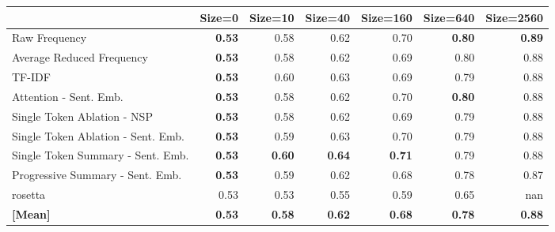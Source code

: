 \begin{tabular}{lrrrrrr}
\toprule
 & Size=0 & Size=10 & Size=40 & Size=160 & Size=640 & Size=2560 \\
\midrule
Raw Frequency & \cellcolor[RGB]{63,83,198}\textbf{0.53} & \cellcolor[RGB]{105,139,239}0.58 & \cellcolor[RGB]{142,177,253}0.62 & \cellcolor[RGB]{214,219,228}0.70 & \cellcolor[RGB]{243,152,121}\textbf{0.80} & \cellcolor[RGB]{179,3,38}\textbf{0.89} \\
Average Reduced Frequency & \cellcolor[RGB]{63,83,198}\textbf{0.53} & \cellcolor[RGB]{105,139,239}0.58 & \cellcolor[RGB]{141,175,253}0.62 & \cellcolor[RGB]{211,219,230}0.69 & \cellcolor[RGB]{244,154,123}0.80 & \cellcolor[RGB]{181,8,39}0.88 \\
TF-IDF & \cellcolor[RGB]{63,83,198}\textbf{0.53} & \cellcolor[RGB]{123,158,248}0.60 & \cellcolor[RGB]{156,188,254}0.63 & \cellcolor[RGB]{213,219,229}0.69 & \cellcolor[RGB]{244,155,124}0.79 & \cellcolor[RGB]{184,17,41}0.88 \\
Attention - Sent. Emb. & \cellcolor[RGB]{63,83,198}\textbf{0.53} & \cellcolor[RGB]{105,139,239}0.58 & \cellcolor[RGB]{146,180,254}0.62 & \cellcolor[RGB]{214,219,228}0.70 & \cellcolor[RGB]{243,152,121}\textbf{0.80} & \cellcolor[RGB]{181,8,39}0.88 \\
Single Token Ablation - NSP & \cellcolor[RGB]{63,83,198}\textbf{0.53} & \cellcolor[RGB]{105,139,239}0.58 & \cellcolor[RGB]{142,177,253}0.62 & \cellcolor[RGB]{211,219,230}0.69 & \cellcolor[RGB]{244,155,124}0.79 & \cellcolor[RGB]{181,8,39}0.88 \\
Single Token Ablation - Sent. Emb. & \cellcolor[RGB]{63,83,198}\textbf{0.53} & \cellcolor[RGB]{116,151,245}0.59 & \cellcolor[RGB]{152,185,254}0.63 & \cellcolor[RGB]{217,220,224}0.70 & \cellcolor[RGB]{244,155,124}0.79 & \cellcolor[RGB]{182,13,40}0.88 \\
Single Token Summary - Sent. Emb. & \cellcolor[RGB]{63,83,198}\textbf{0.53} & \cellcolor[RGB]{126,161,249}\textbf{0.60} & \cellcolor[RGB]{163,193,254}\textbf{0.64} & \cellcolor[RGB]{222,219,218}\textbf{0.71} & \cellcolor[RGB]{244,157,126}0.79 & \cellcolor[RGB]{190,35,45}0.88 \\
Progressive Summary - Sent. Emb. & \cellcolor[RGB]{63,83,198}\textbf{0.53} & \cellcolor[RGB]{116,151,245}0.59 & \cellcolor[RGB]{145,179,254}0.62 & \cellcolor[RGB]{202,216,238}0.68 & \cellcolor[RGB]{246,170,140}0.78 & \cellcolor[RGB]{191,40,46}0.87 \\
rosetta & \cellcolor[RGB]{58,76,192}0.53 & \cellcolor[RGB]{62,81,196}0.53 & \cellcolor[RGB]{78,105,216}0.55 & \cellcolor[RGB]{112,147,243}0.59 & \cellcolor[RGB]{178,203,251}0.65 & \cellcolor[RGB]{0,0,0}nan \\
\midrule 
\textbf{[Mean]} & \textbf{0.53} & \textbf{0.58} & \textbf{0.62} & \textbf{0.68} & \textbf{0.78} & \textbf{0.88} \\
\bottomrule
\end{tabular}